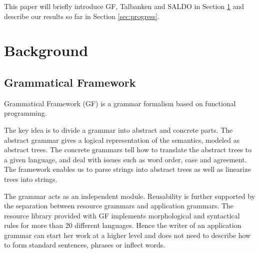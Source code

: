 \documentclass[submission]{eptcs} %
\begin{document}
This paper will briefly introduce GF, Talbanken and SALDO in Section \ref{sec:background}
and describe our results so far in Section \ref{sec:progress}.

\section{Background}
\label{sec:background}
\subsection{Grammatical Framework}
\label{sec:gf}


Grammatical Framework\cite{ranta-2011} (GF) is a grammar formalism based on functional
programming. %

The key idea is to divide a grammar into abstract and concrete parts. %
The abstract grammar gives a logical representation of the semantics,
modeled as abstract trees.
The concrete grammars tell how to translate the abstract trees to a given language,
and deal with issues such as word order, case and agreement. 
The framework enables us to parse strings into 
abstract trees as well as linearize trees into strings.

The grammar acts as an independent module.
Reusability is further supported by the separation between resource grammars
and application grammars. The resource library provided with GF 
implements morphological and
syntactical rules for more than 20 different languages.
Hence the writer of an application grammar can start her work at a higher
level and does not need to describe how to 
form standard sentences, phrases or inflect words.
\end{document}
